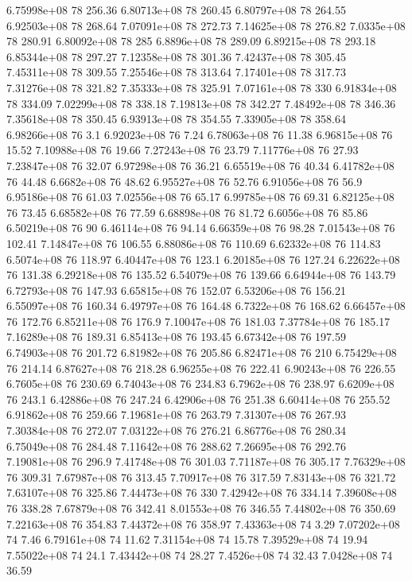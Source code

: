 6.75998e+08 78 256.36
6.80713e+08 78 260.45
6.80797e+08 78 264.55
6.92503e+08 78 268.64
7.07091e+08 78 272.73
7.14625e+08 78 276.82
7.0335e+08 78 280.91
6.80092e+08 78 285
6.8896e+08 78 289.09
6.89215e+08 78 293.18
6.85344e+08 78 297.27
7.12358e+08 78 301.36
7.42437e+08 78 305.45
7.45311e+08 78 309.55
7.25546e+08 78 313.64
7.17401e+08 78 317.73
7.31276e+08 78 321.82
7.35333e+08 78 325.91
7.07161e+08 78 330
6.91834e+08 78 334.09
7.02299e+08 78 338.18
7.19813e+08 78 342.27
7.48492e+08 78 346.36
7.35618e+08 78 350.45
6.93913e+08 78 354.55
7.33905e+08 78 358.64
6.98266e+08 76 3.1
6.92023e+08 76 7.24
6.78063e+08 76 11.38
6.96815e+08 76 15.52
7.10988e+08 76 19.66
7.27243e+08 76 23.79
7.11776e+08 76 27.93
7.23847e+08 76 32.07
6.97298e+08 76 36.21
6.65519e+08 76 40.34
6.41782e+08 76 44.48
6.6682e+08 76 48.62
6.95527e+08 76 52.76
6.91056e+08 76 56.9
6.95186e+08 76 61.03
7.02556e+08 76 65.17
6.99785e+08 76 69.31
6.82125e+08 76 73.45
6.68582e+08 76 77.59
6.68898e+08 76 81.72
6.6056e+08 76 85.86
6.50219e+08 76 90
6.46114e+08 76 94.14
6.66359e+08 76 98.28
7.01543e+08 76 102.41
7.14847e+08 76 106.55
6.88086e+08 76 110.69
6.62332e+08 76 114.83
6.5074e+08 76 118.97
6.40447e+08 76 123.1
6.20185e+08 76 127.24
6.22622e+08 76 131.38
6.29218e+08 76 135.52
6.54079e+08 76 139.66
6.64944e+08 76 143.79
6.72793e+08 76 147.93
6.65815e+08 76 152.07
6.53206e+08 76 156.21
6.55097e+08 76 160.34
6.49797e+08 76 164.48
6.7322e+08 76 168.62
6.66457e+08 76 172.76
6.85211e+08 76 176.9
7.10047e+08 76 181.03
7.37784e+08 76 185.17
7.16289e+08 76 189.31
6.85413e+08 76 193.45
6.67342e+08 76 197.59
6.74903e+08 76 201.72
6.81982e+08 76 205.86
6.82471e+08 76 210
6.75429e+08 76 214.14
6.87627e+08 76 218.28
6.96255e+08 76 222.41
6.90243e+08 76 226.55
6.7605e+08 76 230.69
6.74043e+08 76 234.83
6.7962e+08 76 238.97
6.6209e+08 76 243.1
6.42886e+08 76 247.24
6.42906e+08 76 251.38
6.60414e+08 76 255.52
6.91862e+08 76 259.66
7.19681e+08 76 263.79
7.31307e+08 76 267.93
7.30384e+08 76 272.07
7.03122e+08 76 276.21
6.86776e+08 76 280.34
6.75049e+08 76 284.48
7.11642e+08 76 288.62
7.26695e+08 76 292.76
7.19081e+08 76 296.9
7.41748e+08 76 301.03
7.71187e+08 76 305.17
7.76329e+08 76 309.31
7.67987e+08 76 313.45
7.70917e+08 76 317.59
7.83143e+08 76 321.72
7.63107e+08 76 325.86
7.44473e+08 76 330
7.42942e+08 76 334.14
7.39608e+08 76 338.28
7.67879e+08 76 342.41
8.01553e+08 76 346.55
7.44802e+08 76 350.69
7.22163e+08 76 354.83
7.44372e+08 76 358.97
7.43363e+08 74 3.29
7.07202e+08 74 7.46
6.79161e+08 74 11.62
7.31154e+08 74 15.78
7.39529e+08 74 19.94
7.55022e+08 74 24.1
7.43442e+08 74 28.27
7.4526e+08 74 32.43
7.0428e+08 74 36.59
